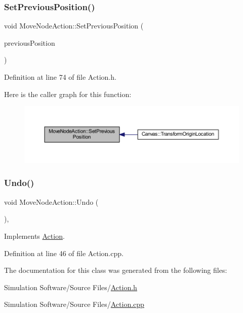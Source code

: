 \subsubsection{\texorpdfstring{Set\+Previous\+Position()}{SetPreviousPosition()}}
{\footnotesize\ttfamily void Move\+Node\+Action\+::\+Set\+Previous\+Position (\begin{DoxyParamCaption}\item[{const wx\+Point2\+D\+Double \&}]{previous\+Position }\end{DoxyParamCaption})\hspace{0.3cm}{\ttfamily [inline]}}



Definition at line 74 of file Action.\+h.

Here is the caller graph for this function\+:
\nopagebreak
\begin{figure}[H]
\begin{center}
\leavevmode
\includegraphics[width=350pt]{class_move_node_action_a70dcb3f48867ce7b5d57c9d15794984a_icgraph}
\end{center}
\end{figure}
\mbox{\label{class_move_node_action_ad2136c2037da52ba1417c0c44b28d579}} 
\subsubsection{\texorpdfstring{Undo()}{Undo()}}
{\footnotesize\ttfamily void Move\+Node\+Action\+::\+Undo (\begin{DoxyParamCaption}{ }\end{DoxyParamCaption})\hspace{0.3cm}{\ttfamily [override]}, {\ttfamily [virtual]}}



Implements \hyperlink{class_action_aab28a6693a01e51712ccbf4d24b6015e}{Action}.



Definition at line 46 of file Action.\+cpp.



The documentation for this class was generated from the following files\+:\begin{DoxyCompactItemize}
\item 
Simulation Software/\+Source Files/\hyperlink{_action_8h}{Action.\+h}\item 
Simulation Software/\+Source Files/\hyperlink{_action_8cpp}{Action.\+cpp}\end{DoxyCompactItemize}
